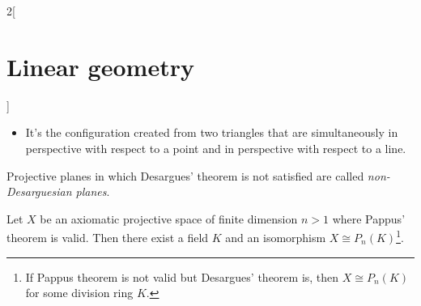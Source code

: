 \documentclass[../../../main.tex]{subfiles}
\begin{document}
\begin{multicols}{2}[\section{Linear geometry}]
\begin{definition}
\begin{itemize}
            \item It's the configuration created from two triangles that are simultaneously in perspective with respect to a point and in perspective with respect to a line.
        \end{itemize}
    \end{definition}
    \begin{definition}
        Projective planes in which Desargues' theorem is not satisfied are called \textit{non-Desarguesian planes}.
    \end{definition}
    \begin{theorem}
        Let $X$ be an axiomatic projective space of finite dimension $n>1$ where Pappus' theorem is valid. Then there exist a field $K$ and an isomorphism $X\cong P_n(K)$\footnote{If Pappus theorem is not valid but Desargues' theorem is, then $X\cong P_n(K)$ for some division ring $K$.}.
    \end{theorem}

\end{multicols}
\end{document}
